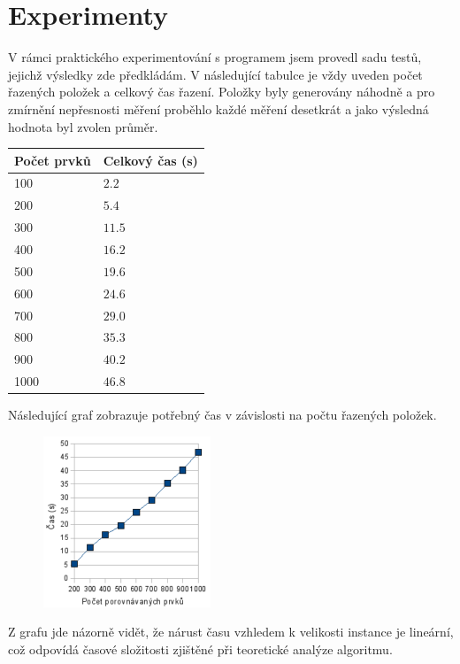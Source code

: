 \documentclass[11pt,a4paper]{article}
\begin{document}
\section{Experimenty}

V rámci praktického experimentování s programem jsem provedl sadu testů,
jejichž výsledky zde předkládám. V následující tabulce je vždy uveden
počet řazených položek a celkový čas řazení. Položky byly generovány náhodně
a pro zmírnění nepřesnosti měření proběhlo každé měření desetkrát a jako
výsledná hodnota byl zvolen průměr.

\begin{center}
	\begin{tabular}{| l | l |}
	\hline
		Počet prvků & Celkový čas (s) \\
	\hline
		100 & $2.2$ \\
		200 & $5.4$ \\
		300 & $11.5$ \\
		400 & $16.2$ \\
		500 & $19.6$ \\
		600 & $24.6$ \\
		700 & $29.0$ \\
		800 & $35.3$ \\
		900 & $40.2$ \\
		1000 & $46.8$ \\
	\hline
	\end{tabular}
\end{center}

\noindent
Následující graf zobrazuje potřebný čas v závislosti na počtu řazených položek.

\begin{figure}[ht]
	\begin{center}
		\includegraphics[width=5.0cm,keepaspectratio]{graph}
	\end{center}
\end{figure}

\noindent
Z grafu jde názorně vidět, že nárust času vzhledem k velikosti instance je
lineární, což odpovídá časové složitosti zjištěné při teoretické analýze algoritmu.
\end{document}
